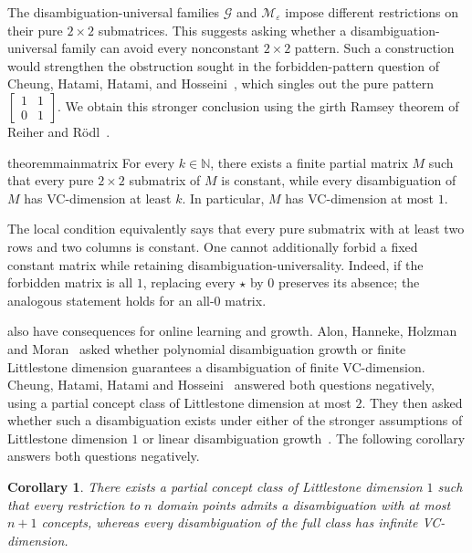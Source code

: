 \documentclass[11pt]{article}
\newtheorem{corollary}[theorem]{Corollary}
\theoremstyle{remark}
\begin{document}
The disambiguation-universal families $\mathcal G$ and $\mathcal M_\varepsilon$ impose different restrictions on their pure $2\times2$ submatrices.
This suggests asking whether a disambiguation-universal family can avoid every nonconstant $2\times2$ pattern.
Such a construction would strengthen the obstruction sought in the forbidden-pattern question of Cheung, Hatami, Hatami, and Hosseini~\cite[Problem~27]{CHHH23}, which singles out the pure pattern
$\begin{bmatrix}1&1\\0&1\end{bmatrix}$.
We obtain this stronger conclusion using the girth Ramsey theorem of Reiher and R\"odl~\cite{RR23}.

\begin{restatable}{theorem}{mainmatrix}\label{thm:matrix-not-disambig}
    For every $k\in\mathbb N$, there exists a finite partial matrix $M$ such that every pure $2\times2$ submatrix of $M$ is constant, while every disambiguation of $M$ has VC-dimension at least $k$.
    In particular, $M$ has VC-dimension at most $1$.
\end{restatable}

The local condition equivalently says that every pure submatrix with at least two rows and two columns is constant.
One cannot additionally forbid a fixed constant matrix while retaining disambiguation-universality.
Indeed, if the forbidden matrix is all $1$, replacing every $\star$ by $0$ preserves its absence; the analogous statement holds for an all-$0$ matrix.

 also have consequences for online learning and growth.
Alon, Hanneke, Holzman and Moran~\cite[Open Questions 2 and 3]{AHHM22} asked whether polynomial disambiguation growth or finite Littlestone dimension guarantees a disambiguation of finite VC-dimension.
Cheung, Hatami, Hatami and Hosseini~\cite{CHHH23} answered both questions negatively, using a partial concept class of Littlestone dimension at most $2$.
They then asked whether such a disambiguation exists under either of the stronger assumptions of Littlestone dimension $1$ or linear disambiguation growth~\cite[Problems 24 and 25]{CHHH23}.
The following corollary answers both questions negatively.

\begin{corollary}
    There exists a partial concept class of Littlestone dimension $1$ such that every restriction to $n$ domain points admits a disambiguation with at most $n+1$ concepts, whereas every disambiguation of the full class has infinite VC-dimension.
\end{corollary}
\end{document}
